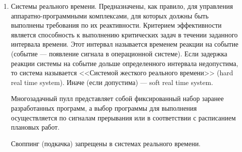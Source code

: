 \begin{enumerate}
	\item Системы реального времени. Предназначены, как правило, для управления
    аппаратно-программными комплексами, для которых должны быть выполнены
    требования по их реактивности. Критерием эффективности является способность
    к выполнению критических задач в течении заданного интервала времени. Этот
    интервал называется временем реакции на событие (событие --- появление
    сигнала в операционной системе). Если задержка реакции системы на событие
    дольше определенного интервала недопустима, то система называется <<Системой
    жесткого реального времени>> (hard real time system). Иначе (если допустима)
    --- soft real time system.\par
    Многозадачный пулл представляет собой фиксированный набор заранее 
    разработанных программ, а выбор программы для выполнения осуществляется по 
    сигналам прерывания или в соответствии с расписанием плановых работ. \par
    Своппинг (подкачка) запрещены в системах реального времени.

\end{enumerate}
